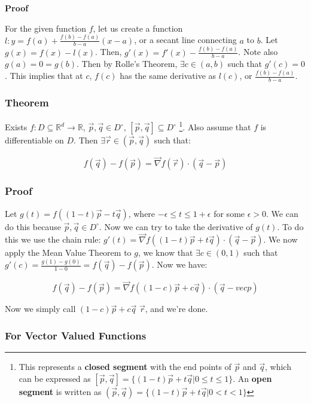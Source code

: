 \documentclass[11 pt, twoside]{article}
\newcommand{\gradient}{\vec{\nabla}}
\begin{document}
\textbf{Proof}

For the given function $f$, let us create a function $l: y = f(a) + \frac{f(b) -
f(a)}{b - a} (x - a)$, or a secant line connecting $a$ to $b$. Let $g(x) = f(x)
- l(x)$. Then, $g'(x) = f'(x) - \frac{f(b) - f(a)}{b - a}$. Note also $g(a) = 0
= g(b)$. Then by Rolle's Theorem, $\exists  c \in (a, b)$ such that $g'(c) = 0$.
This implies that at $c$, $f(c)$ has the same derivative as $l(c)$, or
$\frac{f(b) - f(a)}{b - a}$.

\subsubsection{Theorem}
Exists $f: D \subseteq \mathbb{R}^d \to \mathbb{R}$, $\vec{p}, \vec{q} \in
D^\circ$, $[\vec{p}, \vec{q}] \subseteq D^\circ$ \footnote{This represents a
\textbf{closed segment} with the end points of $\vec{p}$ and $\vec{q}$, which can be
expressed as $[\vec{p}, \vec{q}] = \{(1 - t)\vec{p} + t \vec{q} | 0 \leq t
\leq 1\}$. An \textbf{open segment} is written as $(\vec{p}, \vec{q}) = \{(1 -
t) \vec{p} + t \vec{q} | 0 < t < 1\}$}. Also assume that $f$ is
differentiable on $D$. Then $\exists\vec{r} \in (\vec{p}, \vec{q})$ such that:

$$\boxed{f(\vec{q}) - f(\vec{p}) = \gradient f(\vec{r}) \cdot (\vec{q} - \vec{p})}$$

\subsubsection{Proof}

Let $g(t) = f((1 - t)\vec{p} - t\vec{q})$, where $-\epsilon \leq t \leq 1 +
\epsilon$ for some $\epsilon > 0$. We can do this because $\vec{p},
\vec{q} \in D^\circ$. Now we can try to take the derivative of $g(t)$. To do
this we use the chain rule: $g'(t) = \gradient f((1 - t) \vec{p} + t\vec{q})
\cdot (\vec{q} - \vec{p})$. We now apply the Mean Value Theorem to $g$, we know
that $\exists  c \in (0, 1)$ such that $g'(c) = \frac{g(1) - g(0)}{1 - 0} =
f(\vec{q}) - f(\vec{p})$. Now we have:

$$f(\vec{q}) - f(\vec{p}) = \gradient f((1 - c) \vec{p} + c\vec{q}) \cdot
(\vec{q} - vec{p})$$

Now we simply call $(1 - c)\vec{p} + c\vec{q}$ $\vec{r}$, and we're done.

\subsubsection{For Vector Valued Functions}
\end{document}

